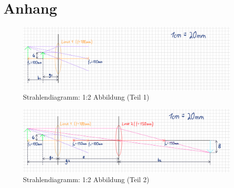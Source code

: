 \documentclass[a4paper]{scrartcl}
\numberwithin{equation}{subsection}
\begin{document}
\newpage
\section{Anhang}

\begin{figure}[H]
\includegraphics[width=20cm, angle=90]{Abbildungen/zeichnung_zwei_linsen_1}
\centering
\caption{Strahlendiagramm: 1:2 Abbildung (Teil 1)}
\centering
\label{fig:zeichnung_zwei_linsen_1}
\end{figure}

\begin{figure}[H]
\includegraphics[width=20cm, angle=90]{Abbildungen/zeichnung_zwei_linsen_2}
\centering
\caption{Strahlendiagramm: 1:2 Abbildung (Teil 2)}
\centering
\label{fig:zeichnung_zwei_linsen_2}
\end{figure}

\newpage


\label{LastPage}
\end{document}
